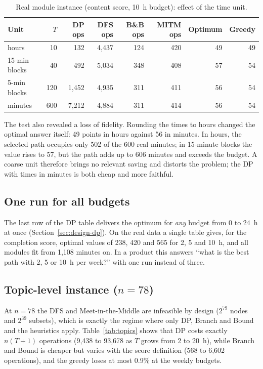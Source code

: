 \begin{table}[h]
\centering
\caption{Real module instance (content score, 10~h budget): effect of the time unit.}\label{tab:granularity}
\small
\begin{tabular}{@{}l r r r r r r r@{}}
\toprule
Unit & $T$ & DP ops & DFS ops & B\&B ops & MITM ops & Optimum & Greedy\\
\midrule
hours & 10 & 132 & 4,437 & 124 & 420 & 49 & 49\\
15-min blocks & 40 & 492 & 5,034 & 348 & 408 & 57 & 54\\
5-min blocks & 120 & 1,452 & 4,935 & 311 & 411 & 56 & 54\\
minutes & 600 & 7,212 & 4,884 & 311 & 414 & 56 & 54\\
\bottomrule
\end{tabular}
\end{table}

The test also revealed a loss of fidelity. Rounding the times to hours changed the optimal answer itself: 49 points in hours against 56 in minutes. In hours, the selected path occupies only 502 of the 600 real minutes; in 15-minute blocks the value rises to 57, but the path adds up to 606 minutes and exceeds the budget. A coarse unit therefore brings no relevant saving and distorts the problem; the DP with times in minutes is both cheap and more faithful.

\subsection{One run for all budgets}

The last row of the DP table delivers the optimum for \emph{any} budget from 0 to 24~h at once (Section~\ref{sec:design-dp}). On the real data a single table gives, for the completion score, optimal values of 238, 420 and 565 for 2, 5 and 10~h, and all modules fit from 1,108 minutes on. In a product this answers ``what is the best path with 2, 5 or 10~h per week?'' with one run instead of three.

\subsection{Topic-level instance ($n=78$)}

At $n=78$ the DFS and Meet-in-the-Middle are infeasible by design ($2^{79}$ nodes and $2^{39}$ subsets), which is exactly the regime where only DP, Branch and Bound and the heuristics apply. Table~\ref{tab:topics} shows that DP costs exactly $n(T+1)$ operations (9,438 to 93,678 as $T$ grows from 2 to 20~h), while Branch and Bound is cheaper but varies with the score definition (568 to 6,602 operations), and the greedy loses at most 0.9\% at the weekly budgets.

